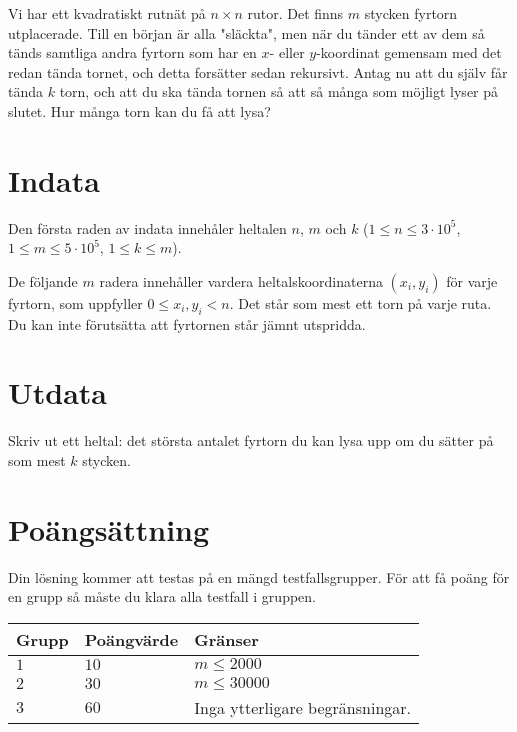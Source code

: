 
Vi har ett kvadratiskt rutnät på $n \times n$ rutor. Det finns $m$ stycken fyrtorn utplacerade.
Till en början är alla "släckta", men när du tänder ett av dem så tänds samtliga andra fyrtorn
som har en $x$- eller $y$-koordinat gemensam med det redan tända tornet, och detta forsätter
sedan rekursivt. Antag nu att du själv får tända $k$ torn, och att du ska tända tornen så att så
många som möjligt lyser på slutet. Hur många torn kan du få att lysa?

\section*{Indata}
Den första raden av indata innehåler heltalen $n$, $m$ och $k$ ($1 \leq n \leq 3 \cdot 10^5$, $1 \leq m \leq 5 \cdot 10^5$, $1 \leq k \leq m$).

De följande $m$ radera innehåller vardera heltalskoordinaterna $(x_i, y_i)$ för varje fyrtorn, som uppfyller $0 \le x_i, y_i < n$.
Det står som mest ett torn på varje ruta. Du kan inte förutsätta att fyrtornen står jämnt utspridda.

\section*{Utdata}
Skriv ut ett heltal: det största antalet fyrtorn du kan lysa upp om du sätter på som mest $k$ stycken.


\section*{Poängsättning}
Din lösning kommer att testas på en mängd testfallsgrupper.
För att få poäng för en grupp så måste du klara alla testfall i gruppen.

\noindent
\begin{tabular}{| l | l | l |}
  \hline
  Grupp & Poängvärde & Gränser \\ \hline \hline
  $1$   & $10$        & $m \leq 2000$ \\ \hline
  $2$   & $30$        & $m \leq 30000$ \\ \hline
  $3$   & $60$        & Inga ytterligare begränsningar. \\ \hline
\end{tabular}
